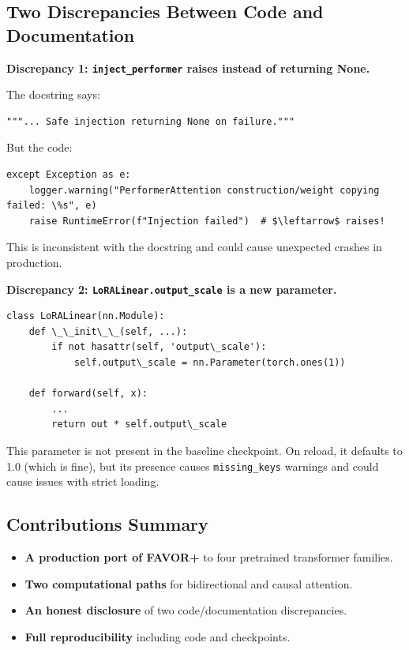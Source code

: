 \subsection{Two Discrepancies Between Code and Documentation}

\textbf{Discrepancy 1: \texttt{inject\_performer} raises instead of returning None.}

The docstring says:

\begin{lstlisting}
"""... Safe injection returning None on failure."""
\end{lstlisting}

But the code:

\begin{lstlisting}
except Exception as e:
    logger.warning("PerformerAttention construction/weight copying failed: \%s", e)
    raise RuntimeError(f"Injection failed")  # $\leftarrow$ raises!
\end{lstlisting}

This is inconsistent with the docstring and could cause unexpected crashes 
in production.

\textbf{Discrepancy 2: \texttt{LoRALinear.output\_scale} is a new parameter.}

\begin{lstlisting}
class LoRALinear(nn.Module):
    def \_\_init\_\_(self, ...):
        if not hasattr(self, 'output\_scale'):
            self.output\_scale = nn.Parameter(torch.ones(1))
    
    def forward(self, x):
        ...
        return out * self.output\_scale
\end{lstlisting}

This parameter is not present in the baseline checkpoint. On reload, it 
defaults to 1.0 (which is fine), but its presence causes \texttt{missing\_keys} 
warnings and could cause issues with strict loading.

\subsection{Contributions Summary}

\begin{itemize}
\item \textbf{A production port of FAVOR+} to four pretrained transformer families.
\item \textbf{Two computational paths} for bidirectional and causal attention.
\item \textbf{An honest disclosure} of two code/documentation discrepancies.
\item \textbf{Full reproducibility} including code and checkpoints.

\end{itemize}
